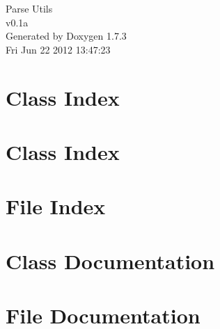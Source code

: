 \documentclass[a4paper]{book}
\begin{document}
\hypersetup{pageanchor=false}
\begin{titlepage}
\vspace*{7cm}
\begin{center}
{\Large Parse Utils \\[1ex]\large v0.1a }\\
\vspace*{1cm}
{\large Generated by Doxygen 1.7.3}\\
\vspace*{0.5cm}
{\small Fri Jun 22 2012 13:47:23}\\
\end{center}
\end{titlepage}
\clearemptydoublepage
{}
\tableofcontents
\clearemptydoublepage
{}
\hypersetup{pageanchor=true}
\chapter{Class Index}

\chapter{Class Index}

\chapter{File Index}

\chapter{Class Documentation}













\chapter{File Documentation}







































\printindex
\end{document}
